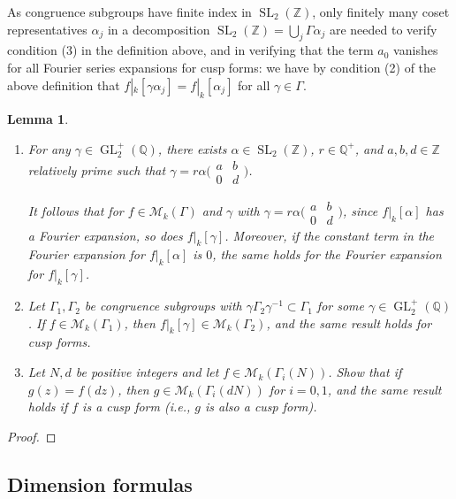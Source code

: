 \documentclass[10pt,leqno,twoside]{article}
\theoremstyle{plain}
\newtheorem{lemma}[lem]{Lemma}
\theoremstyle{definition}
\numberwithin{equation}{section}
\numberwithin{lem}{section}
\newcommand{\textib}[1]{\textbf{\textit{#1\index{#1}}}} %
\DeclareMathOperator{\GL}{GL}
\DeclareMathOperator{\SL}{SL}
\newcommand{\slz}{\SL_2(\mathbb{Z})}
\newcommand{\glqp}{\GL_2^+(\mathbb{Q})}
\newcommand{\tbd}{{\Huge\color{red}{\textib{TBD}}}}
\begin{document}
As congruence subgroups have finite index in $\slz$, only finitely many coset representatives $\alpha_j$ in a decomposition $\slz= \bigcup_{j}\varGamma\alpha_j$ are needed to verify condition (3) in the definition above, and in verifying that the term $a_0$ vanishes for all Fourier series expansions for cusp forms: we have by condition (2) of the above definition that $f|_k[\gamma\alpha_j] = f|_k[\alpha_j]$ for all $\gamma\in\varGamma$.

\begin{lemma}\label{lem: weight k operator properties}
    \begin{enumerate}[label = \textup{(\alph*)}]
        \item For any $\gamma\in\glqp$, there exists $\alpha\in\slz$, $r\in\mathbb Q^+$, and $a,b,d\in\mathbb Z$ relatively prime such that $\gamma = r\alpha \big(\!\begin{smallmatrix}
            a & b \\ 0 & d
        \end{smallmatrix}\!\big)$. 
    
        It follows that for $f\in\mathcal M_k(\varGamma)$ and $\gamma$ with $\gamma = r\alpha \big(\!\begin{smallmatrix}
            a & b \\ 0 & d
        \end{smallmatrix}\!\big)$, since $f|_k[\alpha]$ has a Fourier expansion, so does $f|_k[\gamma]$. Moreover, if the constant term in the Fourier expansion for $f|_k[\alpha]$ is $0$, the same holds for the Fourier expansion for $f|_k[\gamma]$.
        \item Let $\varGamma_1,\varGamma_2$ be congruence subgroups with $\gamma\varGamma_2\gamma^{-1}\subset \varGamma_1$ for some $\gamma\in\glqp$. If $f\in\mathcal M_k(\varGamma_1)$, then $f|_k[\gamma]\in\mathcal M_k(\varGamma_2)$, and the same result holds for cusp forms.
        \item Let $N,d$ be positive integers and let $f\in\mathcal M_k(\varGamma_i(N))$. Show that if $g(z) = f(dz)$, then $g\in\mathcal M_k(\varGamma_i(dN))$ for $i = 0,1$, and the same result holds if $f$ is a cusp form (i.e., $g$ is also a cusp form).
    \end{enumerate}  
\end{lemma}
\begin{proof}
    \tbd
\end{proof}
\subsection{Dimension formulas}
\end{document}
